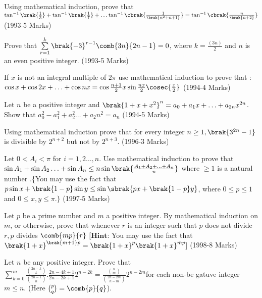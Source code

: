 \iffalse
\title{Assignment 1}
\author{AI24BTECH11017 - MAANYA SRI}
\section{subjective}
\fi

\item Using mathematical induction, prove that $\tan^{-1}\brak{\frac{1}{3}}  +  \tan^{-1}\brak{\frac{1}{7}} + \ldots \tan^{-1}\cbrak{\frac{1}{\brak{n^2 + n + 1}}} = \tan^{-1}\cbrak{\frac{n}{\brak{n+2}}}$
\hfill(1993-5 Marks) 
\item Prove that $\sum\limits^{k}_{r=1} \brak{-3}^{r-1} \comb{3n}{2n-1} = 0$, where $k=\frac{(3n)}{2}$ and $n$ is an even positive integer.
\hfill(1993-5 Marks)
\item If $x$ is not an integral multiple of $2\pi$ use mathematical induction to prove that : 
$\cos{x} + \cos{2x} + \ldots + \cos{nx} = \cos{\frac{n+1}{2}x}\sin{\frac{nx}{2}}\cosec{\frac{x}{2}}$
\hfill(1994-4 Marks)
\item 
Let $n$ be a positive integer and $\brak{1+x+x^2}^n = a_0 + a_1 x + \ldots + a_{2n} x^{2n}$. Show that $a_0^2 - a_1^2 + a_2^2 \ldots + a_2n^2 = a_n$
\hfill(1994-5 Marks)
\item 
Using mathematical induction prove that for every integer $n \geq 1 , \brak{3^{2n} -1}$ is divisible by $2^{n+2}$ but not by $2^{n+3}$.
\hfill(1996-3 Marks)
\item 
Let $0<A_i<\pi$ for $i= 1,2\ldots,n$. Use mathematical induction to prove that $\sin{A_1} + \sin{A_2}\ldots + \sin{A_n} \leq  n \sin{\brak{\frac{A_1 + A_2 +\ldots+ A_n}{n}}}$ where $\geq 1$ is a natural number .\{You may use the fact that $p \sin{x} + \brak{1-p}\sin{y}\leq \sin{\sbrak{px + \brak{1-p}y}}$, where $0 \leq p \leq 1$ and $0 \leq x,y \leq \pi.\}$
\hfill(1997-5 Marks)
\item 
Let $p$ be a prime number and $m$ a positive integer. By mathematical induction on $m$, or otherwise, prove that whenever $r$ is an integer such that $p$ does not divide $r , p$ divides $\comb{mp}{r}$
$[\textbf{Hint:}$ You may use the fact that $\brak{1+x}^{\brak{m+1}p} = \brak{1+x}^p\brak{1+x}^{mp}]$
\hfill(1998-8 Marks)
\item 
Let $n$ be any positive integer. Prove that $\sum\limits^{m}_{k=0}\frac{\binom{2n-k}{k}}{\binom{2n-1}{n}}.\frac{2n-4k+1}{2n-2k+1}2^{n-2k}= \frac{\binom{n}{m}}{\binom{2n-2m}{n-m}} 2^{n-2m}$for each non-be gatuve integer $m\leq n$. (Here $\binom{p}{q} = \comb{p}{q}$).
